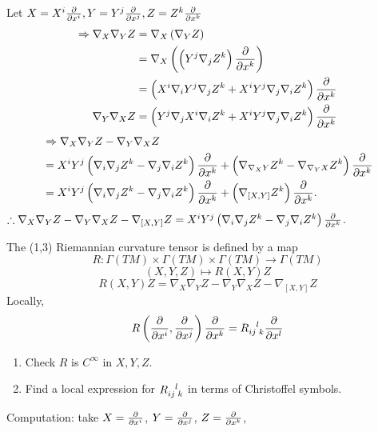   Let \(X=X^i\pdv{x^i},Y=Y^j\pdv{x^j},Z=Z^k\pdv{x^k}\)
  \begin{align*}
    \Rightarrow \nabla_X\nabla_Y Z&=
    \nabla_X\left(\nabla_Y Z\right)\\
    &=\nabla_X\left(\left(Y^j \nabla_j Z^k\right)\pdv{x^k}\right)\\
    &=\left(X^i\nabla_i Y^j\nabla_j Z^k+X^i Y^j\nabla_j\nabla_i Z^k
    \right)\pdv{x^k}\\
    \nabla_Y\nabla_X Z&=\left(Y^j\nabla_j X^i \nabla_i Z^k
    +X^iY^j \nabla_j\nabla_i Z^k\right)\pdv{x^k}
  \end{align*}
  \begin{align*}
    &\Rightarrow \nabla_X\nabla_Y Z-\nabla_Y\nabla_X Z\\
    &=
    X^i Y^j\left(\nabla_i\nabla_j Z^k-\nabla_j\nabla_i Z^k\right)
    \pdv{x^k}+\left(\nabla_{\nabla_X Y}Z^k-\nabla_{\nabla
    _Y X }Z^k\right)\pdv{x^k}\\
    &=X^i Y^j\left(\nabla_i\nabla_j Z^k-\nabla_j\nabla_i Z^k\right)
    \pdv{x^k}
    +\left(\nabla_{[X,Y]}Z^k\right)\pdv{x^k}.
  \end{align*}
  \(\therefore \nabla_X\nabla_Y Z-\nabla_Y\nabla_X Z -\nabla_{[X,Y]}Z=
  X^i Y^j\left(\nabla_i\nabla_j Z^k-\nabla_j\nabla_i Z^k\right)
    \pdv{x^k}
  \).
\begin{definition}
    The (1,3) Riemannian curvature tensor is defined by a map 
    \[
        R\colon \Gamma(TM)\times \Gamma(TM)\times \Gamma(TM)
        \to \Gamma(TM)    
    \]
    \[
        \left(X,Y,Z\right)\mapsto R(X,Y)Z    
    \]
    \[
        R(X,Y)Z=\nabla_X\nabla_Y Z-\nabla_Y\nabla_X Z -\nabla_{[X,Y]}Z    
    \]
    Locally, 
    \[
        R\left(\pdv{x^i},\pdv{x^j}\right)\pdv{x^k}=R\indices{_{ij}^l_k}
        \pdv{x^l}    
    \]
\end{definition}
\begin{exercise}
    \begin{enumerate}[(1)]
        \item Check \(R\) is \(C^\infty\) in \(X,Y,Z\).
        \item Find a local expression for \(R\indices{_{ij}^l_k}\)
        in terms of Christoffel symbols.
    \end{enumerate}
\end{exercise}
Computation: take \(X=\pdv{x^i}\), \(Y=\pdv{x^j}\), \(Z=\pdv{x^k}\),

